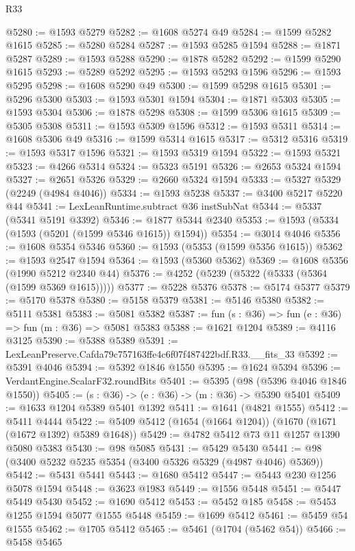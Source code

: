 \begin{lexlean}{R33}
\begin{coremodule}
@5280 := @1593 @5279
@5282 := @1608 @5274 @49
@5284 := @1599 @5282 @1615
@5285 := @5280 @5284
@5287 := @1593 @5285 @1594
@5288 := @1871 @5287
@5289 := @1593 @5288
@5290 := @1878 @5282
@5292 := @1599 @5290 @1615
@5293 := @5289 @5292
@5295 := @1593 @5293 @1596
@5296 := @1593 @5295
@5298 := @1608 @5290 @49
@5300 := @1599 @5298 @1615
@5301 := @5296 @5300
@5303 := @1593 @5301 @1594
@5304 := @1871 @5303
@5305 := @1593 @5304
@5306 := @1878 @5298
@5308 := @1599 @5306 @1615
@5309 := @5305 @5308
@5311 := @1593 @5309 @1596
@5312 := @1593 @5311
@5314 := @1608 @5306 @49
@5316 := @1599 @5314 @1615
@5317 := @5312 @5316
@5319 := @1593 @5317 @1596
@5321 := @1593 @5319 @1594
@5322 := @1593 @5321
@5323 := @4266 @5314
@5324 := @5323 @5191
@5326 := @2653 @5324 @1594
@5327 := @2651 @5326
@5329 := @2660 @5324 @1594
@5333 := @5327 @5329 (@2249 (@4984 @4046))
@5334 := @1593 @5238
@5337 := @3400 @5217 @5220 @44
@5341 := LexLeanRuntime.subtract @36 instSubNat
@5344 := @5337 (@5341 @5191 @3392)
@5346 := @1877 @5344 @2340
@5353 := @1593 (@5334 (@1593 (@5201 (@1599 @5346 @1615)) @1594))
@5354 := @3014 @4046
@5356 := @1608 @5354 @5346
@5360 := @1593 (@5353 (@1599 @5356 @1615))
@5362 := @1593 @2547 @1594
@5364 := @1593 (@5360 @5362)
@5369 := @1608 @5356 (@1990 @5212 @2340 @44)
@5376 := @4252 (@5239 (@5322 (@5333 (@5364 (@1599 @5369 @1615)))))
@5377 := @5228 @5376
@5378 := @5174 @5377
@5379 := @5170 @5378
@5380 := @5158 @5379
@5381 := @5146 @5380
@5382 := @5111 @5381
@5383 := @5081 @5382
@5387 := fun (s : @36) => fun (e : @36) => fun (m : @36) => @5081 @5383
@5388 := @1621 @1204
@5389 := @4116 @3125
@5390 := @5388 @5389
@5391 := LexLeanPreserve.Cafda79c757163ffe4c6f07f487422bdf.R33.__fits_33
@5392 := @5391 @4046
@5394 := @5392 @1846 @1550
@5395 := @1624 @5394
@5396 := VerdantEngine.ScalarF32.roundBits
@5401 := @5395 (@98 (@5396 @4046 @1846 @1550))
@5405 := (s : @36) -> (e : @36) -> (m : @36) -> @5390 @5401
@5409 := @1633 @1204 @5389 @5401 @1392
@5411 := @1641 (@4821 @1555)
@5412 := @5411 @4444
@5422 := @5409 @5412 (@1654 (@1664 @1204)) (@1670 (@1671 (@1672 @1392) @5389 @1648))
@5429 := @4782 @5412 @73 @11 @1257 @1390 @5080 @5383
@5430 := @98 @5085
@5431 := @5429 @5430
@5441 := @98 (@3400 @5232 @5235 @5354 (@3400 @5326 @5329 (@4987 @4046) @5369))
@5442 := @5431 @5441
@5443 := @1680 @5412
@5447 := @5443 @230 @1256 @5078 @1594
@5448 := @3623 @1983
@5449 := @1556 @5448
@5451 := @5447 @5449 @5430
@5452 := @1690 @5412
@5453 := @5452 @185
@5458 := @5453 @1255 @1594 @5077 @1555 @5448
@5459 := @1699 @5412
@5461 := @5459 @54 @1555
@5462 := @1705 @5412
@5465 := @5461 (@1704 (@5462 @54))
@5466 := @5458 @5465

\end{coremodule}
\end{lexlean}
